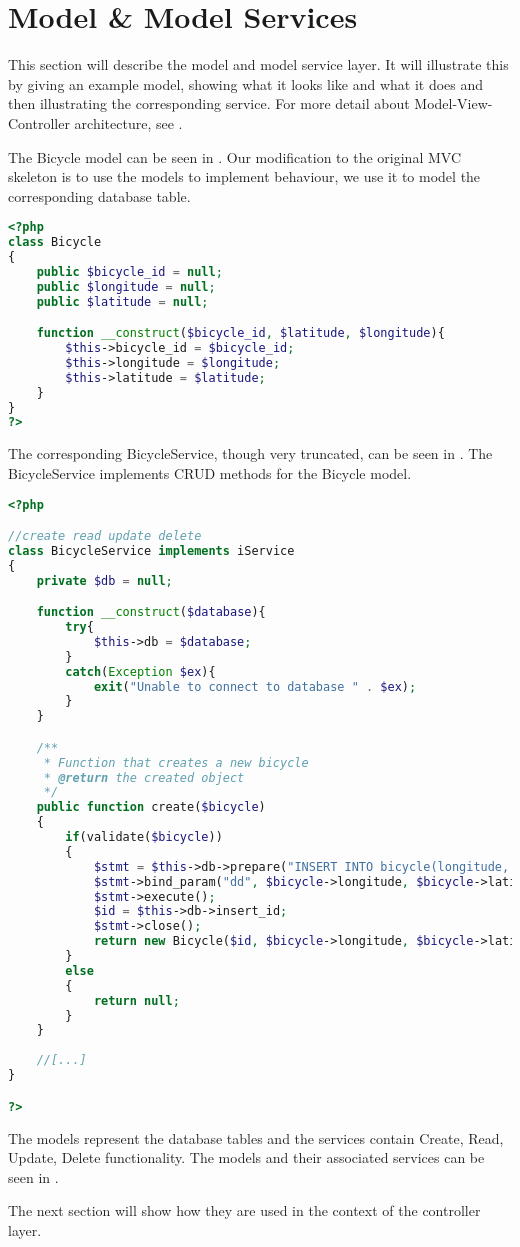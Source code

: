 \section{Model \& Model Services}
This section will describe the model and model service layer.
It will illustrate this by giving an example model, showing what it looks like and what it does and then illustrating the corresponding service.
For more detail about Model-View-Controller architecture, see .

The Bicycle model can be seen in .
Our modification to the original MVC skeleton is to use the models to implement behaviour, we use it to model the corresponding database table.

\begin{minipage}{\textwidth}
\begin{lstlisting}[language=php, label=lst:bicycleModel, caption={Bicycle Class}]
<?php
class Bicycle
{
    public $bicycle_id = null;
    public $longitude = null;
    public $latitude = null;

    function __construct($bicycle_id, $latitude, $longitude){
        $this->bicycle_id = $bicycle_id;
        $this->longitude = $longitude;
        $this->latitude = $latitude;
    }
}
?>
\end{lstlisting}
\end{minipage}

The corresponding BicycleService, though very truncated, can be seen in . 
The BicycleService implements CRUD methods for the Bicycle model.

\begin{lstlisting}[language=php, label=lst:bicycleService, caption={BicycleService Class}]
<?php

//create read update delete
class BicycleService implements iService
{
    private $db = null;

    function __construct($database){
        try{
            $this->db = $database;
        }
        catch(Exception $ex){
            exit("Unable to connect to database " . $ex);
        }
    }

    /**
     * Function that creates a new bicycle
     * @return the created object
     */
    public function create($bicycle)
    {
        if(validate($bicycle))
        {
            $stmt = $this->db->prepare("INSERT INTO bicycle(longitude, latitude) VALUES (?,?)");
            $stmt->bind_param("dd", $bicycle->longitude, $bicycle->latitude);
            $stmt->execute();
            $id = $this->db->insert_id;
            $stmt->close();
            return new Bicycle($id, $bicycle->longitude, $bicycle->latitude);
        }
        else
        {
            return null;
        }
    }
    
    //[...]
}

?>
\end{lstlisting}

The models represent the database tables and the services contain Create, Read, Update, Delete functionality. 
The models and their associated services can be seen in .

The next section will show how they are used in the context of the controller layer.